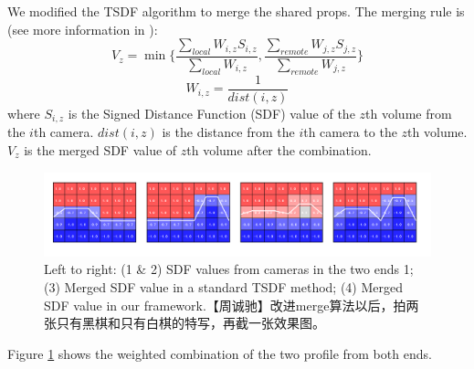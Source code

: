 We modified the TSDF algorithm to merge the shared props. The merging rule is (see more information in \cite{curless1996volumetric}):
\begin{equation}
V_z=\min\{\frac{\sum_{local} W_{i,z}S_{i,z}}{\sum_{local} W_{i,z}},\frac{\sum_{remote} W_{j,z}S_{j,z}}{\sum_{remote} W_{j,z}}\}
\end{equation}
\begin{equation}
W_{i,z}=\frac{1}{dist(i,z)}    
\end{equation}
where $S_{i,z}$ is the Signed Distance Function (SDF) value of the $z$th volume from the $i$th camera. $dist(i,z)$ is the distance from the $i$th camera to the $z$th volume. $V_z$ is the merged SDF value of $z$th volume after the combination.

\begin{figure}[!htbp]
\centering
\includegraphics[width=1.0\linewidth]{figures/figure_tsdf.png}
\caption{Left to right: (1 \& 2) SDF values from cameras in the two ends 1; (3) Merged SDF value in a standard TSDF method; (4) Merged SDF value in our framework.【周诚驰】改进merge算法以后，拍两张只有黑棋和只有白棋的特写，再截一张效果图。}
\label{fig:TSDF_merge_two_sides}
\end{figure}

Figure \ref{fig:TSDF_merge_two_sides} shows the weighted combination of the two profile from both ends.
